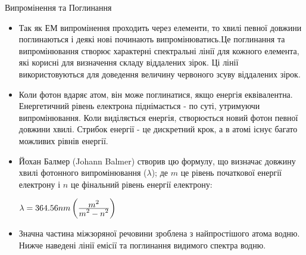 {\Large Випромінення та Поглинання}
\begin{itemize}


\item Так як ЕМ випромінення проходить через елементи, то хвилі певної довжини  поглинаються і деякі нові починають випромінюватись.Це поглинання та випромінювання створює характерні спектральні лінії для кожного елемента, які корисні для визначення складу віддалених зірок. Ці лінії використовуються для доведення величину червоного зсуву віддалених зірок.

\item Коли фотон вдаряє атом, він може поглинатися, якщо енергія еквівалентна. Енергетичний рівень електрона піднімається - по суті, утримуючи випромінювання. Коли виділяється енергія, створюється новий фотон певної довжини хвилі. Стрибок енергії - це дискретний крок, а в атомі існує багато можливих рівнів енергії.

\item Йохан Балмер (Johann Balmer) створив цю формулу, що визначає довжину хвилі фотонного випромінювання ($\lambda$); де $m$ це рівень початкової енергії електрону і $n$ це фінальний рівень енергії електрону:

\hspace{1in}$\lambda = 364.56nm \left( \frac{\displaystyle m^2}{\displaystyle m^2 - n^2} \right)$

\item Значна частина міжзоряної речовини зроблена з найпростішого атома водню. Нижче наведені лінії емісії та поглинання видимого спектра водню.

\end{itemize}



